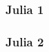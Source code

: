 \begin{frame}
    \frametitle{Julia 1}
\end{frame}

\begin{frame}
    \frametitle{Julia 2}
\end{frame}
